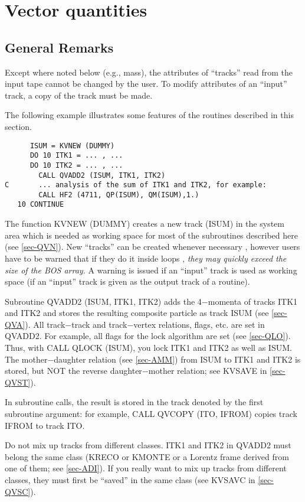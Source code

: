 \section{\label{sec-QV}Vector quantities}
\par
\subsection{\label{sec-QVE}General Remarks}
\par
Except where noted below (e.g., mass), the attributes of ``tracks''
read from the input tape cannot be changed by the user. To modify
attributes of an ``input'' track, a copy of the track must be made.
\par
The following example illustrates some features of the routines
described in this section.
\par
\begin{verbatim}
      ISUM = KVNEW (DUMMY)
      DO 10 ITK1 = ... , ...
      DO 10 ITK2 = ... , ...
        CALL QVADD2 (ISUM, ITK1, ITK2)
C       ... analysis of the sum of ITK1 and ITK2, for example:
        CALL HF2 (4711, QP(ISUM), QM(ISUM),1.)
   10 CONTINUE
\end{verbatim}
\par The function KVNEW (DUMMY) creates a new track (ISUM) in the
system
area which is
needed as working space for most of the subroutines described here
(see \ref{sec-QVN}).
New ``tracks'' can be created whenever necessary ,
however users have to be warned that if they do it inside loops ,
{\em they may quickly exceed the size of the BOS array.}
A warning is issued
if an ``input'' track is used as working space (\ie if an ``input''
track is given as the output track of a routine).
 
\par Subroutine QVADD2 (ISUM, ITK1, ITK2) adds the 4$-$momenta of
tracks
ITK1 and ITK2 and stores the resulting composite particle as track
ISUM (see \ref{sec-QVA}).
All track$-$track and track$-$vertex relations, flags, etc. are
set in
QVADD2. For example, all flags for the lock algorithm are set
(see \ref{sec-QLO}). Thus, with
CALL QLOCK (ISUM), you lock ITK1 and ITK2 as well as ISUM.
The mother$-$daughter relation (see
\ref{sec-AMM}) from ISUM to ITK1 and ITK2 is stored, but
NOT the reverse daughter$-$mother relation; see KVSAVE in
\ref{sec-QVST}).
 
\par In subroutine calls, the result is stored in the track denoted
by the
first subroutine argument: for example,
CALL QVCOPY (ITO, IFROM) copies track IFROM
to track ITO.
\par Do not mix up tracks from different classes. ITK1 and ITK2 in
QVADD2
must belong the same class (KRECO or KMONTE or a Lorentz frame derived
from one of them; see
\ref{sec-ADI}). If you really want to mix up tracks from
different classes, they must first be ``saved'' in the same
class (see KVSAVC in \ref{sec-QVSC}).
 

